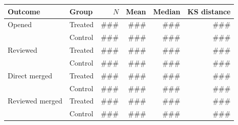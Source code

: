\small
\begin{tabular}{llrrrr}
\toprule
Outcome & Group & $N$ & Mean & Median & KS distance \\
\midrule
Opened & Treated & ### & ### & ### & ### \\
       & Control & ### & ### & ### & ### \\
Reviewed & Treated & ### & ### & ### & ### \\
         & Control & ### & ### & ### & ### \\
Direct merged & Treated & ### & ### & ### & ### \\
              & Control & ### & ### & ### & ### \\
Reviewed merged & Treated & ### & ### & ### & ### \\
                & Control & ### & ### & ### & ### \\
\bottomrule
\end{tabular}
